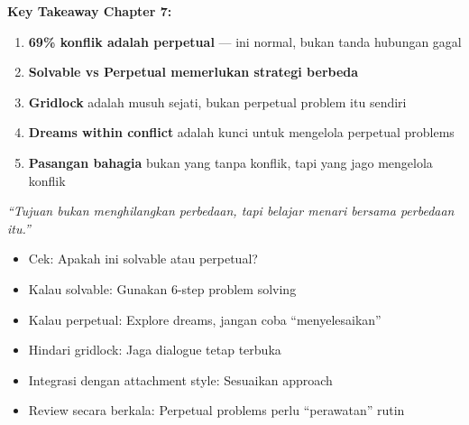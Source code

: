 \begin{insightbox}
\textbf{Key Takeaway Chapter 7:}
\begin{enumerate}
    \item \textbf{69\% konflik adalah perpetual} --- ini normal, bukan tanda hubungan gagal
    \item \textbf{Solvable vs Perpetual memerlukan strategi berbeda}
    \item \textbf{Gridlock} adalah musuh sejati, bukan perpetual problem itu sendiri
    \item \textbf{Dreams within conflict} adalah kunci untuk mengelola perpetual problems
    \item \textbf{Pasangan bahagia} bukan yang tanpa konflik, tapi yang jago mengelola konflik
\end{enumerate}

\textit{``Tujuan bukan menghilangkan perbedaan, tapi belajar menari bersama perbedaan itu.''}
\end{insightbox}

\begin{tipbox}
\begin{itemize}
    \item[$\square$] Cek: Apakah ini solvable atau perpetual?
    \item[$\square$] Kalau solvable: Gunakan 6-step problem solving
    \item[$\square$] Kalau perpetual: Explore dreams, jangan coba ``menyelesaikan''
    \item[$\square$] Hindari gridlock: Jaga dialogue tetap terbuka
    \item[$\square$] Integrasi dengan attachment style: Sesuaikan approach
    \item[$\square$] Review secara berkala: Perpetual problems perlu ``perawatan'' rutin
\end{itemize}
\end{tipbox}
